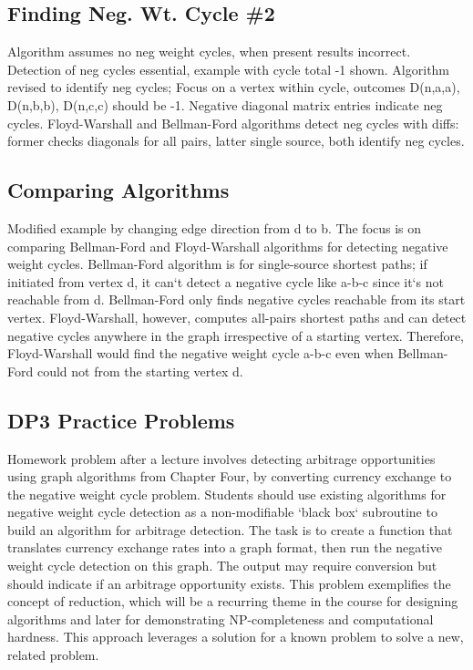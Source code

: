 \subsection*{Finding Neg.
Wt.
Cycle \#2}
Algorithm assumes no neg weight cycles, when present results incorrect.
Detection of neg cycles essential, example with cycle total -1 shown.
Algorithm revised to identify neg cycles; Focus on a vertex within cycle, outcomes D(n,a,a), D(n,b,b), D(n,c,c) should be -1.
Negative diagonal matrix entries indicate neg cycles.
Floyd-Warshall and Bellman-Ford algorithms detect neg cycles with diffs: former checks diagonals for all pairs, latter single source, both identify neg cycles.

\subsection*{Comparing Algorithms}
Modified example by changing edge direction from d to b.
The focus is on comparing Bellman-Ford and Floyd-Warshall algorithms for detecting negative weight cycles.
Bellman-Ford algorithm is for single-source shortest paths; if initiated from vertex d, it can`t detect a negative cycle like a-b-c since it`s not reachable from d.
Bellman-Ford only finds negative cycles reachable from its start vertex.
Floyd-Warshall, however, computes all-pairs shortest paths and can detect negative cycles anywhere in the graph irrespective of a starting vertex.
Therefore, Floyd-Warshall would find the negative weight cycle a-b-c even when Bellman-Ford could not from the starting vertex d.

\subsection*{DP3  Practice Problems}
Homework problem after a lecture involves detecting arbitrage opportunities using graph algorithms from Chapter Four, by converting currency exchange to the negative weight cycle problem.
Students should use existing algorithms for negative weight cycle detection as a non-modifiable `black box` subroutine to build an algorithm for arbitrage detection.
The task is to create a function that translates currency exchange rates into a graph format, then run the negative weight cycle detection on this graph.
The output may require conversion but should indicate if an arbitrage opportunity exists.
This problem exemplifies the concept of reduction, which will be a recurring theme in the course for designing algorithms and later for demonstrating NP-completeness and computational hardness.
This approach leverages a solution for a known problem to solve a new, related problem.

